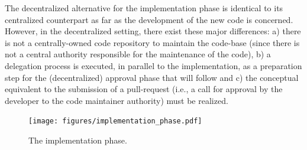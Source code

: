 
The decentralized alternative for the implementation phase is identical to its centralized counterpart as far as the development of the new code is concerned. However, in the decentralized setting, there exist these major differences:
a) there is not a centrally-owned code repository to maintain the code-base (since there is not a central authority responsible for the maintenance of the code), b) a delegation process is executed, in parallel to the implementation, as a preparation step for the (decentralized) approval phase that will follow and c) the conceptual equivalent to the submission of a pull-request (i.e., a call for approval by the developer to the code maintainer authority) must be realized.

\begin{figure}[h!] %
    \caption{The implementation phase.}
    \centering
    \texttt{[image: figures/implementation\_phase.pdf]}
    \label{implementation}
\end{figure}



